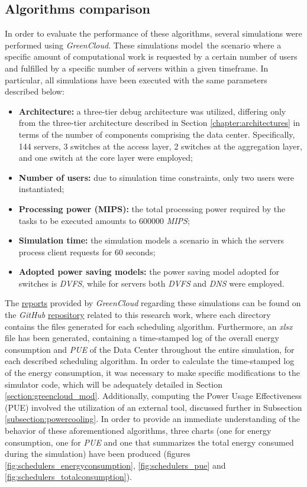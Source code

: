 \subsection{Algorithms comparison}
In order to evaluate the performance of these algorithms, several simulations were performed using \emph{GreenCloud}. These simulations model\ the scenario where a specific amount of computational work is requested by a certain number of users and fulfilled by a specific number of servers within a given timeframe. In particular, all simulations have been executed with the same parameters described below:
\begin{itemize}
    \item \textbf{Architecture:} a three-tier debug architecture was utilized, differing only from the three-tier architecture described in Section \ref{chapter:architectures} in terms of the number of components comprising the data center. Specifically, 144 servers, 3 switches at the access layer, 2 switches at the aggregation layer, and one switch at the core layer were employed;
    \item \textbf{Number of users:} due to simulation time constraints, only two users were instantiated;
    \item \textbf{Processing power (MIPS):} the total processing power required by the tasks to be executed amounts to 600000 \emph{MIPS};
    \item \textbf{Simulation time:} the simulation models a scenario in which the servers process client requests for 60 seconds;
    \item \textbf{Adopted power saving models:} the power saving model adopted for switches is \emph{DVFS}, while for servers both \emph{DVFS} and \emph{DNS} were employed.
\end{itemize}
The \href{https://github.com/vincenzo-emanuele/masters-degree-thesis/tree/main/scheduling\_algorithms\_comparison/simulations}{reports} provided by \emph{GreenCloud} regarding these simulations can be found on the \emph{GitHub} \href{https://github.com/vincenzo-emanuele/masters-degree-thesis}{repository} related to this research work, where each directory contains the files generated for each scheduling algorithm. Furthermore, an \emph{xlsx} file has been generated, containing a time-stamped log of the overall energy consumption and \emph{PUE} of the Data Center throughout the entire simulation, for each described scheduling algorithm. In order to calculate the time-stamped log of the energy consumption, it was necessary to make specific modifications to the simulator code, which will be adequately detailed in Section \ref{section:greencloud_mod}. Additionally, computing the Power Usage Effectiveness (PUE) involved the utilization of an external tool, discussed further in Subsection \ref{subsection:powercooling}. In order to provide an immediate understanding of the behavior of these aforementioned algorithms, three charts (one for energy consumption, one for \emph{PUE} and one that summarizes the total energy consumed during the simulation) have been produced (figures \ref{fig:schedulers_energyconsumption}, \ref{fig:schedulers_pue} and \ref{fig:schedulers_totalconsumption}). \\
